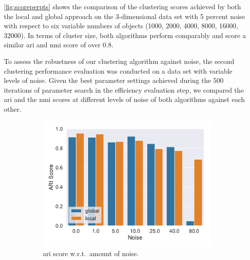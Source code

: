 \autoref{fig:scoreperpts} shows the comparison of the clustering scores achieved by both the local and global approach on the 3-dimensional data set with 5 percent noise with respect to six variable numbers of objects (1000, 2000, 4000, 8000, 16000, 32000). In terms of cluster size, both algorithms perform comparably and score a similar \gls{ari} and \gls{nmi} score of over $0.8$. 

To assess the robustness of our clustering algorithm against noise, the second clustering performance evaluation was conducted on a data set with variable levels of noise. Given the best parameter settings achieved during the 500 iterations of parameter search in the efficiency evaluation step, we compared the \gls{ari} and the \gls{nmi} scores at different levels of noise of both algorithms against each other.
\begin{figure}[h]
    \centering
    \begin{subfigure}[t]{.5\textwidth}
      \centering  
      \captionsetup{width=.9\linewidth}
      \includegraphics[width=\textwidth]{new_evaluation/per_noise/Best_ARI_3D_O10000_pnoise_bar.pdf}
      \caption{\gls{ari} score w.r.t.\ amount of noise.}
      \label{fig:ariperpts}
    \end{subfigure}%
    \begin{subfigure}[t]{.5\textwidth}
      \centering
      \captionsetup{width=.9\linewidth}

\end{subfigure}
\end{figure}

